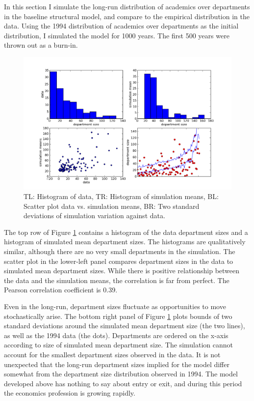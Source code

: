 In this section I simulate the long-run distribution of academics over departments
in the baseline structural model, and compare to the empirical
distribution in the data.  Using the 1994 distribution of academics over departments
as the initial distribution, I simulated the model for 1000 years.  The first 500
years were thrown out as a burn-in.

\begin{figure}[!ht]
    \centering
    \includegraphics[scale=0.5]{pics/mov_plts.png}
    \caption{TL: Histogram of data, TR: Histogram of simulation means, BL: Scatter plot data vs. simulation means, BR: Two standard deviations of simulation variation against data.}
    \label{fig:mov_plts}
\end{figure}

The top row of Figure \ref{fig:mov_plts} contains a histogram of the data department sizes
and a histogram of simulated mean department sizes.  The histograms are qualitatively similar,
although there are no very small departments in the simulation.  The scatter plot in the 
lower-left panel compares department sizes in the data to simulated mean department sizes.
While there is positive relationship between the data and the simulation
means, the correlation is far from perfect. The Pearson correlation coefficient is 0.39.

Even in the long-run, department sizes fluctuate as opportunities to move stochastically
arise.  The bottom right panel of Figure \ref{fig:mov_plts} plots bounds
of two standard deviations around the simulated mean department size (the two lines), as well
as the 1994 data (the dots).  Departments are ordered on the x-axis according to size of
simulated mean department size.  The simulation cannot account for 
the smallest department sizes observed in the data.  It is not unexpected that the long-run department sizes
implied for the model differ somewhat from the
department size distribution observed in 1994.  The model
developed above has nothing to say about entry or exit, and during this period the economics
profession is growing rapidly.

